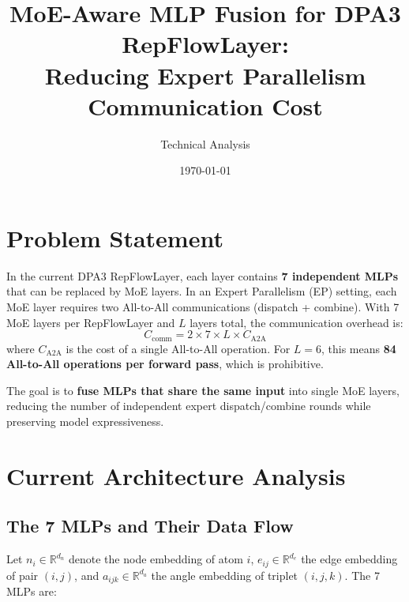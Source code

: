 \documentclass[11pt,a4paper]{article}
\title{MoE-Aware MLP Fusion for DPA3 RepFlowLayer:\\
Reducing Expert Parallelism Communication Cost}
\author{Technical Analysis}
\date{\today}
\newcommand{\R}{\mathbb{R}}
\begin{document}
\maketitle

\section{Problem Statement}

In the current DPA3 RepFlowLayer, each layer contains \textbf{7 independent MLPs} that can be replaced by MoE layers. In an Expert Parallelism (EP) setting, each MoE layer requires two All-to-All communications (dispatch + combine). With 7 MoE layers per RepFlowLayer and $L$ layers total, the communication overhead is:
\begin{equation}
    C_{\text{comm}} = 2 \times 7 \times L \times C_{\text{A2A}}
\end{equation}
where $C_{\text{A2A}}$ is the cost of a single All-to-All operation. For $L=6$, this means \textbf{84 All-to-All operations per forward pass}, which is prohibitive.

The goal is to \textbf{fuse MLPs that share the same input} into single MoE layers, reducing the number of independent expert dispatch/combine rounds while preserving model expressiveness.

\section{Current Architecture Analysis}

\subsection{The 7 MLPs and Their Data Flow}

Let $n_i \in \R^{d_n}$ denote the node embedding of atom $i$, $e_{ij} \in \R^{d_e}$ the edge embedding of pair $(i,j)$, and $a_{ijk} \in \R^{d_a}$ the angle embedding of triplet $(i,j,k)$. The 7 MLPs are:
\end{document}
